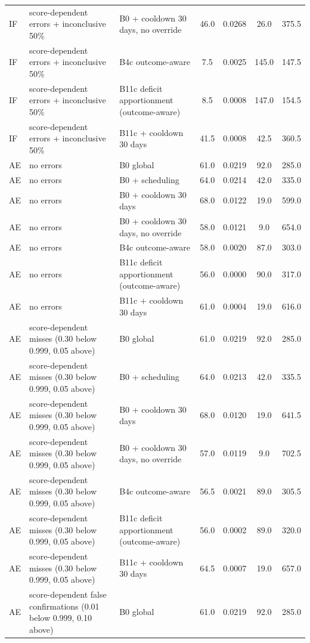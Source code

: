\documentclass[10pt,onecolumn,letterpaper]{article}
\begin{document}
\begin{longtable}{lp{5.2cm}p{4.4cm}cccc}
IF & score-dependent errors + inconclusive 50\% & B0 + cooldown 30 days, no override & 46.0 & 0.0268 & 26.0 & 375.5 \\
IF & score-dependent errors + inconclusive 50\% & B4c outcome-aware & 7.5 & 0.0025 & 145.0 & 147.5 \\
IF & score-dependent errors + inconclusive 50\% & B11c deficit apportionment (outcome-aware) & 8.5 & 0.0008 & 147.0 & 154.5 \\
IF & score-dependent errors + inconclusive 50\% & B11c + cooldown 30 days & 41.5 & 0.0008 & 42.5 & 360.5 \\
AE & no errors & B0 global & 61.0 & 0.0219 & 92.0 & 285.0 \\
AE & no errors & B0 + scheduling & 64.0 & 0.0214 & 42.0 & 335.0 \\
AE & no errors & B0 + cooldown 30 days & 68.0 & 0.0122 & 19.0 & 599.0 \\
AE & no errors & B0 + cooldown 30 days, no override & 58.0 & 0.0121 & 9.0 & 654.0 \\
AE & no errors & B4c outcome-aware & 58.0 & 0.0020 & 87.0 & 303.0 \\
AE & no errors & B11c deficit apportionment (outcome-aware) & 56.0 & 0.0000 & 90.0 & 317.0 \\
AE & no errors & B11c + cooldown 30 days & 61.0 & 0.0004 & 19.0 & 616.0 \\
AE & score-dependent misses (0.30 below 0.999, 0.05 above) & B0 global & 61.0 & 0.0219 & 92.0 & 285.0 \\
AE & score-dependent misses (0.30 below 0.999, 0.05 above) & B0 + scheduling & 64.0 & 0.0213 & 42.0 & 335.5 \\
AE & score-dependent misses (0.30 below 0.999, 0.05 above) & B0 + cooldown 30 days & 68.0 & 0.0120 & 19.0 & 641.5 \\
AE & score-dependent misses (0.30 below 0.999, 0.05 above) & B0 + cooldown 30 days, no override & 57.0 & 0.0119 & 9.0 & 702.5 \\
AE & score-dependent misses (0.30 below 0.999, 0.05 above) & B4c outcome-aware & 56.5 & 0.0021 & 89.0 & 305.5 \\
AE & score-dependent misses (0.30 below 0.999, 0.05 above) & B11c deficit apportionment (outcome-aware) & 56.0 & 0.0002 & 89.0 & 320.0 \\
AE & score-dependent misses (0.30 below 0.999, 0.05 above) & B11c + cooldown 30 days & 64.5 & 0.0007 & 19.0 & 657.0 \\
AE & score-dependent false confirmations (0.01 below 0.999, 0.10 above) & B0 global & 61.0 & 0.0219 & 92.0 & 285.0 \\

\end{longtable}
\end{document}

